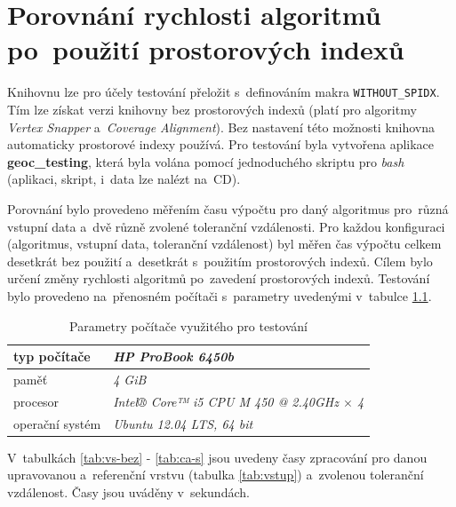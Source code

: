 \chapter[Porovnání rychlosti algoritmů]{Porovnání rychlosti algoritmů po~použití prostorových indexů}
\label{priloha-testovani}

Knihovnu  lze pro účely testování přeložit s~definováním makra 
\texttt{WITHOUT\_SPIDX}. Tím lze získat verzi knihovny bez prostorových indexů
(platí pro algoritmy \textit{Vertex Snapper} a~\textit{Coverage Alignment}).
Bez nastavení této možnosti knihovna automaticky prostorové indexy používá. 
Pro testování byla vytvořena aplikace \textbf{geoc\_testing}, která byla 
volána pomocí jednoduchého skriptu pro \textit{bash} (aplikaci, skript,
 i~data lze nalézt na~CD). 

Porovnání bylo provedeno měřením času výpočtu pro daný algoritmus
pro~různá vstupní data a~dvě různě zvolené toleranční vzdálenosti.
Pro každou konfiguraci (algoritmus, vstupní data, toleranční vzdálenost)
byl měřen čas výpočtu celkem desetkrát bez použití a~desetkrát s~použitím
prostorových indexů. Cílem bylo určení změny rychlosti algoritmů po~zavedení
prostorových indexů. Testování bylo provedeno na~přenosném počítači 
s~parametry uvedenými v~tabulce \ref{tab:parametry}. 

\begin{table}[H]
 \centering
  \caption{Parametry počítače využitého pro testování}
\begin{tabular}{|l|l|}
\hline
 typ počítače & \textit{HP ProBook 6450b} \\
\hline
 paměť & \textit{4 GiB} \\
\hline
 procesor &\textit{Intel® Core™ i5 CPU M 450 @ 2.40GHz $\times$ 4 }\\
\hline
 operační systém &\textit{Ubuntu 12.04 LTS, 64 bit}\\
\hline
\end{tabular}
  \label{tab:parametry}
\end{table}

V~tabulkách \ref{tab:vs-bez} - \ref{tab:ca-s} jsou uvedeny časy zpracování pro 
danou upravovanou a~re\-ferenční vrstvu (tabulka \ref{tab:vstup}) a~zvolenou 
toleranční vzdálenost. Časy jsou uváděny v~sekundách. 

